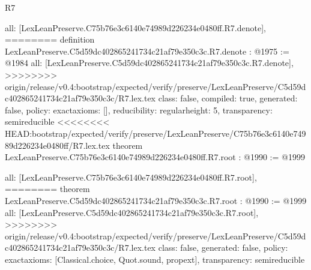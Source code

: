 \begin{lexlean}{R7}
\begin{coremodule}
{{{{{{{{{{{{  all: [LexLeanPreserve.C75b76e3c6140e74989d226234e0480ff.R7.denote],
========
definition LexLeanPreserve.C5d59dc402865241734c21af79e350c3c.R7.denote : @1975 := @1984 {
  all: [LexLeanPreserve.C5d59dc402865241734c21af79e350c3c.R7.denote],
>>>>>>>> origin/release/v0.4:bootstrap/expected/verify/preserve/LexLeanPreserve/C5d59dc402865241734c21af79e350c3c/R7.lex.tex
  class: false,
  compiled: true,
  generated: false,
  policy: exact{axioms: []},
  reducibility: regular{height: 5},
  transparency: semireducible
}
<<<<<<<< HEAD:bootstrap/expected/verify/preserve/LexLeanPreserve/C75b76e3c6140e74989d226234e0480ff/R7.lex.tex
theorem LexLeanPreserve.C75b76e3c6140e74989d226234e0480ff.R7.root : @1990 := @1999 {
  all: [LexLeanPreserve.C75b76e3c6140e74989d226234e0480ff.R7.root],
========
theorem LexLeanPreserve.C5d59dc402865241734c21af79e350c3c.R7.root : @1990 := @1999 {
  all: [LexLeanPreserve.C5d59dc402865241734c21af79e350c3c.R7.root],
>>>>>>>> origin/release/v0.4:bootstrap/expected/verify/preserve/LexLeanPreserve/C5d59dc402865241734c21af79e350c3c/R7.lex.tex
  class: false,
  generated: false,
  policy: exact{axioms: [Classical.choice, Quot.sound, propext]},
  transparency: semireducible
}

}}}}}}}}}}}}}
\end{coremodule}
\end{lexlean}
